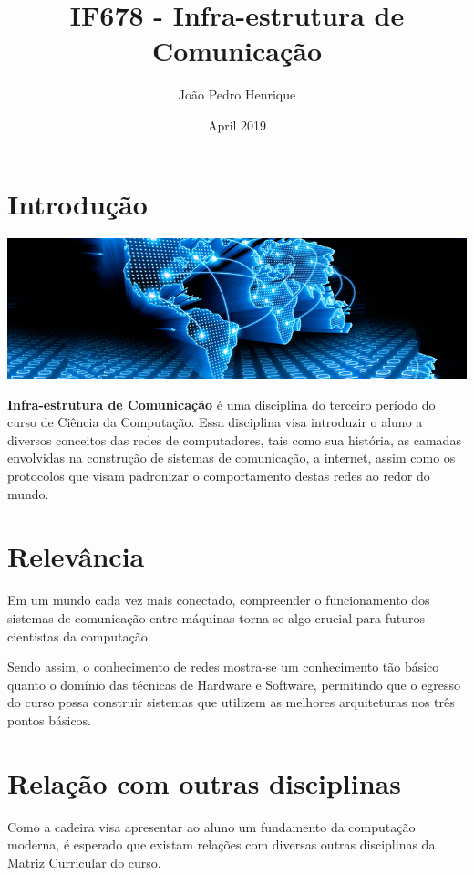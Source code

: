 \documentclass{article}
\title{IF678 - Infra-estrutura de Comunicação}
\author{João Pedro Henrique}
\date{April 2019}
\begin{document}
\maketitle

\section{Introdução}
\includegraphics[scale=0.42]{redes.jpg}

\textbf{Infra-estrutura de Comunicação} é uma disciplina do terceiro período do curso de Ciência da Computação. Essa disciplina visa introduzir o aluno a diversos conceitos das redes de computadores, tais como sua história, as camadas envolvidas na construção de sistemas de comunicação, a internet, assim como os protocolos que visam padronizar o comportamento destas redes ao redor do mundo.

\section{Relevância}
Em um mundo cada vez mais conectado, compreender o funcionamento dos sistemas de comunicação entre máquinas torna-se algo crucial para futuros cientistas da computação.

Sendo assim, o conhecimento de redes mostra-se um conhecimento tão básico quanto o domínio das técnicas de Hardware e Software, permitindo que o egresso do curso possa construir sistemas que utilizem as melhores arquiteturas nos três pontos básicos.

\section{Relação com outras disciplinas}

Como a cadeira visa apresentar ao aluno um fundamento da computação moderna, é esperado que existam relações com diversas outras disciplinas da Matriz Curricular do curso.
\end{document}
